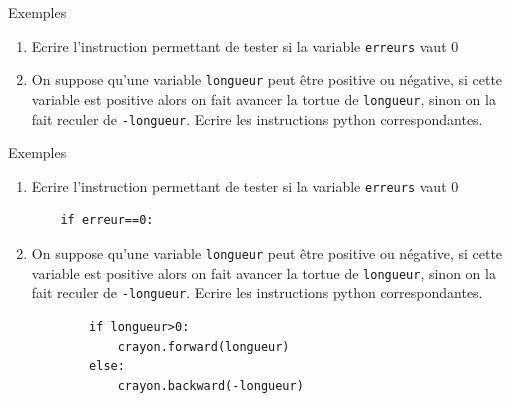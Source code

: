 \documentclass[10pt]{beamer}
\begin{document}
\begin{frame}[fragile]
	\mframe{\Python}
	\begin{exampleblock}{Exemples}
		\begin{enumerate}
			\item<1-> Ecrire l'instruction permettant de tester si la variable {\tt erreurs} vaut 0
			\item<2-> On suppose qu'une variable {\tt longueur} peut être positive ou négative, si cette variable est positive alors on fait avancer la tortue de {\tt longueur}, sinon on la fait reculer de {\tt -longueur}.
			      Ecrire les instructions python correspondantes.
		\end{enumerate}
	\end{exampleblock}
\end{frame}

\begin{frame}[fragile]
	\mframe{\Python}
	\begin{exampleblock}{Exemples}
		\begin{enumerate}
			\item Ecrire l'instruction permettant de tester si la variable {\tt erreurs} vaut 0
			      \begin{lstlisting}
    if erreur==0:
		\end{lstlisting}
			\item On suppose qu'une variable {\tt longueur} peut être positive ou négative, si cette variable est positive alors on fait avancer la tortue de {\tt longueur}, sinon on la fait reculer de {\tt -longueur}.
			      Ecrire les instructions python correspondantes.
			      \begin{lstlisting}
		if longueur>0:
			crayon.forward(longueur)
		else:
			crayon.backward(-longueur)
	\end{lstlisting}
		\end{enumerate}
	\end{exampleblock}
\end{frame}
\end{document}
